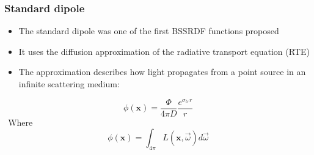 \documentclass{beamer}
\newcommand{\vomega}{\vec{\omega}}
\newcommand{\x}{\mathbf{x}}
\begin{document}
\begin{frame}
    \frametitle{Standard dipole}
			\begin{itemize}
				\item The standard dipole \citep{Jensen:2001:PMS:383259.383319} was one of the first BSSRDF functions proposed
				\item It uses the diffusion approximation \citep{books/daglib/0093591} of the radiative transport equation (RTE)
				\item The approximation describes how light propagates from a point source in an infinite scattering medium:
			\end{itemize}
\begin{equation*}
\phi(\x) = \frac{\Phi}{4\pi D} \frac{e^{\sigma_{tr} r}}{r}
\label{eq:dasimple}
\end{equation*}
$\ \ $Where
$$\phi(\x) = \int_{4\pi}L(\x,\vomega) d\vomega$$
\end{frame}
\end{document}
